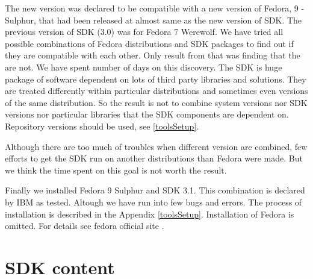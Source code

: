 \par
The new version was declared to be compatible with a new version of Fedora, 9 - Sulphur, that had been released at almost same as the new version of SDK.
The previous version of SDK (3.0) was for Fedora 7 Werewolf.
We have tried all possible combinations of Fedora distributions and SDK packages to find out if they are compatible with each other.
Only result from that was finding that the are not.
We have spent number of days on this discovery.
The SDK is huge package of software dependent on lots of third party libraries and solutions.
They are treated differently within particular distributions and sometimes even versions of the same distribution.
So the result is not to combine system versions nor SDK versions nor particular libraries that the SDK components are dependent on.
Repository versions should be used, see \ref{toolsSetup}.

\par
Although there are too much of troubles when different version are combined, few efforts to get the SDK run on another distributions than Fedora were made.
But we think the time spent on this goal is not worth the result.

\par
Finally we installed Fedora 9 Sulphur and SDK 3.1.
This combination is declared by IBM as tested.
Altough we have run into few bugs and errors.
The process of installation is described in the Appendix \ref{toolsSetup}.
Installation of Fedora is omitted.
For details see fedora official site \cite{fedorasite}.

\section {SDK content}

